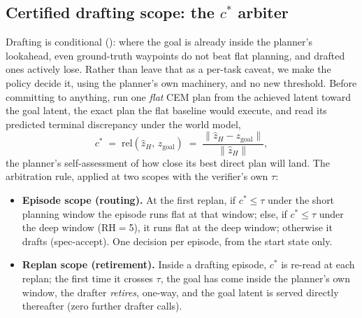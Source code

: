 \documentclass{article}
\begin{document}
\subsection{Certified drafting scope: the $c^{*}$ arbiter}
\label{sec:method-arbiter}
Drafting is conditional (): where the goal is already inside the
planner's lookahead, even ground-truth waypoints do not beat flat planning, and drafted
ones actively lose. Rather than leave that as a per-task caveat, we make the policy
decide it, using the planner's own machinery, and no new threshold. Before
committing to anything, run one \emph{flat} CEM plan from the achieved latent toward
the goal latent, the exact plan the flat baseline would execute, and read its
predicted terminal discrepancy under the world model,
\[
c^{*} \;=\; \mathrm{rel}\!\left(\hat z_{H},\, z_{\mathrm{goal}}\right)
\;=\; \frac{\lVert \hat z_{H}-z_{\mathrm{goal}}\rVert}{\lVert \hat z_{H}\rVert},
\]
the planner's self-assessment of how close its best direct plan will land. The
arbitration rule, applied at two scopes with the verifier's own $\tau$:

\begin{itemize}[itemsep=1pt,topsep=2pt]
\item \textbf{Episode scope (routing).} At the first replan, if $c^{*}\!\le\tau$ under
the short planning window the episode runs flat at that window; else, if $c^{*}\!\le\tau$
under the deep window (RH$=$5), it runs flat at the deep window; otherwise it drafts
(spec-accept). One decision per episode, from the start state only.
\item \textbf{Replan scope (retirement).} Inside a drafting episode, $c^{*}$ is
re-read at each replan; the first time it crosses $\tau$, the goal has come inside
the planner's own window, the drafter \emph{retires}, one-way, and the goal latent
is served directly thereafter (zero further drafter calls).
\end{itemize}
\end{document}
